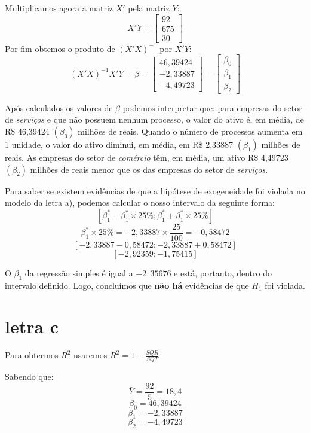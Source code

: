 Multiplicamos agora a matriz \(X'\) pela matriz \(Y\):
\[
    X'Y =
    \begin{bmatrix}
        92 \\
        675 \\
        30
    \end{bmatrix}
\]
 Por fim obtemos o produto de \((X'X)^{-1}\) por \(X'Y\):
 \[
    (X'X)^{-1}X'Y = \beta =
    \begin{bmatrix}
        46,39424 \\
        -2,33887 \\
        -4,49723
    \end{bmatrix} =
    \begin{bmatrix}
        \beta_{0} \\
        \beta_{1} \\
        \beta_{2}
    \end{bmatrix}
 \]

Após calculados os valores de \(\beta\) podemos interpretar que: para empresas do setor de \textit{serviços} e que não possuem nenhum processo, o valor do ativo é, em média, de R\$ 46,39424 \((\beta_{0})\) milhões de reais. Quando o número de processos aumenta em 1 unidade, o valor do ativo diminui, em média, em R\$ 2,33887 \((\beta_{1})\) milhões de reais. As empresas do setor de \textit{comércio} têm, em média, um ativo R\$ 4,49723 \((\beta_{2})\) milhões de reais menor que os das empresas do setor de \textit{serviços}.

Para saber se existem evidências de que a hipótese de exogeneidade foi violada no modelo da letra a), podemos calcular o nosso intervalo da seguinte forma:
\[ [\beta^{*}_{1}-\beta^{*}_{1} \times 25\%;\beta^{*}_{1}+\beta^{*}_{1} \times 25\%]\]
\[\beta^{*}_{1} \times 25\% = -2,33887 \times \frac{25}{100} = -0,58472\]
\[[-2,33887 - 0,58472;-2,33887 + 0,58472]\]
\[[-2,92359;-1,75415]\]

O \(\beta_{1}\) da regressão simples é igual a \(-2,35676\) e está, portanto, dentro do intervalo definido. Logo, concluímos que \textbf{não há} evidências de que \(H_{1}\) foi violada.

\section*{letra c}
Para obtermos \(R^{2}\) usaremos \(R^{2} = 1 - \frac{SQR}{SQT}\)

Sabendo que:
\[\bar{Y} = \frac{92}{5} = 18,4 \]
\[\beta_{0} = 46,39424 \]
\[\beta_{1} = -2,33887 \]
\[\beta_{2} = -4,49723 \]

